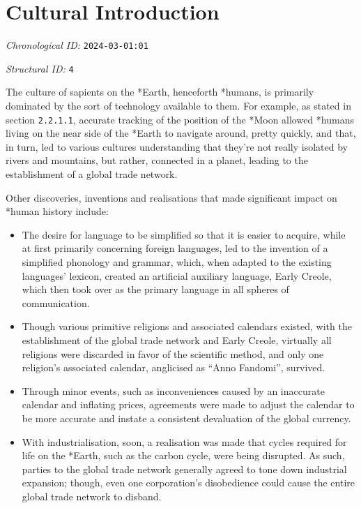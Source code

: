 \section{Cultural Introduction}
\emph{Chronological ID:} \texttt{2024-03-01:01}

\emph{Structural ID:} \texttt{4}

The culture of sapients on the *Earth, henceforth *humans, is primarily dominated by the sort of technology available to them. For example, as stated in section \texttt{2.2.1.1}, accurate tracking of the position of the *Moon allowed *humans living on the near side of the *Earth to navigate around, pretty quickly, and that, in turn, led to various cultures understanding that they're not really isolated by rivers and mountains, but rather, connected in a planet, leading to the establishment of a global trade network.

Other discoveries, inventions and realisations that made significant impact on *human history include:

\begin{itemize}
  \item The desire for language to be simplified so that it is easier to acquire, while at first primarily concerning foreign languages, led to the invention of a simplified phonology and grammar, which, when adapted to the existing languages' lexicon, created an artificial auxiliary language, Early Creole, which then took over as the primary language in all spheres of communication.
  \item Though various primitive religions and associated calendars existed, with the establishment of the global trade network and Early Creole, virtually all religions were discarded in favor of the scientific method, and only one religion's associated calendar, anglicised as ``Anno Fandomi'', survived.
  \item Through minor events, such as inconveniences caused by an inaccurate calendar and inflating prices, agreements were made to adjust the calendar to be more accurate and instate a consistent devaluation of the global currency.
  \item With industrialisation, soon, a realisation was made that cycles required for life on the *Earth, such as the carbon cycle, were being disrupted. As such, parties to the global trade network generally agreed to tone down industrial expansion; though, even one corporation's disobedience could cause the entire global trade network to disband.
\end{itemize}
\newpage
